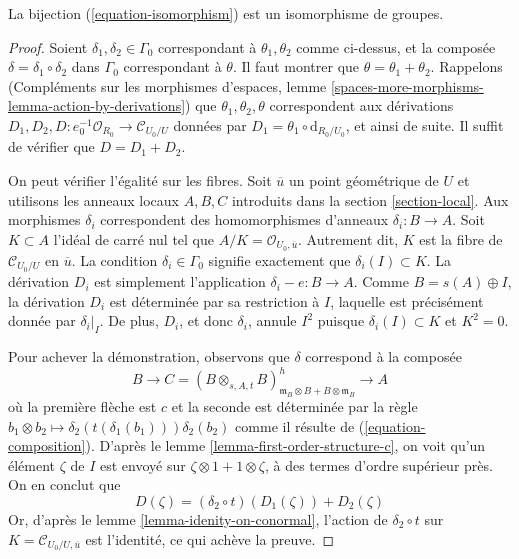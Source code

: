 \begin{lemma}
\label{lemma-composition-is-addition}
La bijection (\ref{equation-isomorphism}) est un isomorphisme
de groupes.
\end{lemma}

\begin{proof}
Soient $\delta_1, \delta_2 \in \Gamma_0$ correspondant à $\theta_1, \theta_2$
comme ci-dessus, et la composée $\delta = \delta_1 \circ \delta_2$
dans $\Gamma_0$ correspondant à $\theta$. Il faut montrer que
$\theta = \theta_1 + \theta_2$. Rappelons
(Compléments sur les morphismes d'espaces, lemme
\ref{spaces-more-morphisms-lemma-action-by-derivations})
que $\theta_1, \theta_2, \theta$ correspondent aux dérivations
$D_1, D_2, D : e_0^{-1}\mathcal{O}_{R_0} \to \mathcal{C}_{U_0/U}$
données par $D_1 = \theta_1 \circ \text{d}_{R_0/U_0}$, et ainsi de suite.
Il suffit de vérifier que $D = D_1 + D_2$.

\medskip\noindent
On peut vérifier l'égalité sur les fibres.
Soit $\overline{u}$ un point géométrique de $U$ et utilisons les anneaux
locaux $A, B, C$ introduits dans la section \ref{section-local}.
Aux morphismes $\delta_i$ correspondent des homomorphismes d'anneaux
$\delta_i : B \to A$. Soit $K \subset A$ l'idéal de carré nul tel que
$A/K = \mathcal{O}_{U_0, \overline{u}}$.
Autrement dit, $K$ est la fibre de $\mathcal{C}_{U_0/U}$ en $\overline{u}$.
La condition $\delta_i \in \Gamma_0$
signifie exactement que $\delta_i(I) \subset K$.
La dérivation $D_i$ est simplement l'application $\delta_i - e : B \to A$.
Comme $B = s(A) \oplus I$, la dérivation $D_i$ est déterminée par
sa restriction à $I$, laquelle est précisément donnée par
$\delta_i|_I$. De plus, $D_i$, et donc $\delta_i$, annule $I^2$
puisque $\delta_i(I) \subset K$ et $K^2 = 0$.

\medskip\noindent
Pour achever la démonstration, observons que $\delta$ correspond à la
composée
$$
B \to C =
(B \otimes_{s, A, t} B)^h_{\mathfrak m_B \otimes B + B \otimes \mathfrak m_B}
\to A
$$
où la première flèche est $c$ et la seconde est déterminée
par la règle
$b_1 \otimes b_2 \mapsto \delta_2(t(\delta_1(b_1))) \delta_2(b_2)$
comme il résulte de (\ref{equation-composition}).
D'après le lemme \ref{lemma-first-order-structure-c},
on voit qu'un élément $\zeta$ de $I$ est envoyé sur
$\zeta \otimes 1 + 1 \otimes \zeta$, à des termes d'ordre supérieur près.
On en conclut que
$$
D(\zeta) = (\delta_2 \circ t)\left(D_1(\zeta)\right) + D_2(\zeta)
$$
Or, d'après le lemme \ref{lemma-idenity-on-conormal},
l'action de $\delta_2 \circ t$ sur
$K = \mathcal{C}_{U_0/U, \overline{u}}$ est l'identité, ce qui
achève la preuve.
\end{proof}






